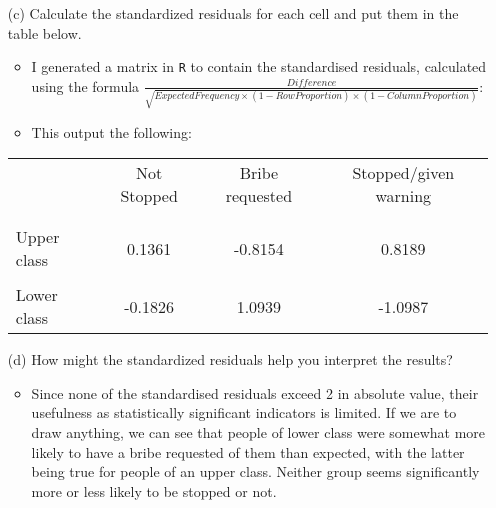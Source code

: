 \documentclass[12pt,letterpaper]{article}
\begin{document}
\begin{enumerate}
		\vspace{1cm}
		
		\item [(c)] Calculate the standardized residuals for each cell and put them in the table below.
		
		\begin{itemize}
			\item I generated a matrix in \texttt{R} to contain the standardised residuals, calculated using the formula $\frac{Difference}{\sqrt{Expected Frequency \times (1-Row Proportion) \times (1-Column Proportion)}}$: 
			\item This output the following:
		\end{itemize}
		
		\begin{table}[h]
			\centering
			\begin{tabular}{l | c c c }
				& Not Stopped & Bribe requested & Stopped/given warning \\
				\\[-1.8ex] 
				\hline \\[-1.8ex]
				Upper class & 0.1361 & -0.8154 & 0.8189 \\
				\\
				Lower class & -0.1826 & 1.0939 & -1.0987 \\
				
			\end{tabular}
		\end{table}
		
		\vspace{1cm}
		
		\item [(d)] How might the standardized residuals help you interpret the results?  
		
		\begin{itemize}
			\item Since none of the standardised residuals exceed 2 in absolute value, their usefulness as statistically significant indicators is limited. If we are to draw anything, we can see that people of lower class were somewhat more likely to have a bribe requested of them than expected, with the latter being true for people of an upper class. Neither group seems significantly more or less likely to be stopped or not.
		\end{itemize}
		
	\end{enumerate}
	\newpage
	
\end{document}
